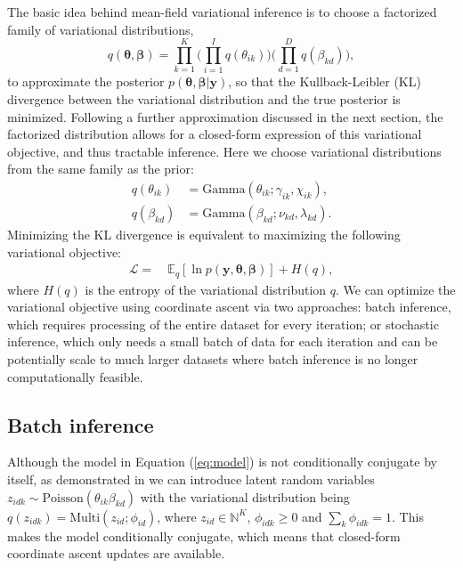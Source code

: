 The basic idea behind mean-field variational
inference is to choose a factorized family of variational distributions,
\begin{equation}
q(\boldsymbol{\theta}, \boldsymbol{\beta}) = \prod_{k=1}^K \Big(\prod_{i=1}^I q(\theta_{ik})\Big) \Big(\prod_{d=1}^D q(\beta_{kd})\Big),
\end{equation}
to approximate the posterior $p(\boldsymbol{\theta}, \boldsymbol{\beta} | \boldsymbol{y})$, so that the
Kullback-Leibler (KL) divergence between the variational distribution and
the true posterior is minimized. Following a further approximation discussed in the next section, the factorized distribution allows for a closed-form expression of this variational objective, and thus tractable inference. Here we choose variational distributions from the same family as the prior:
\begin{equation}
\begin{split}
q(\theta_{ik}) &= \text{Gamma}(\theta_{ik}; \gamma_{ik}, \chi_{ik}),\\
q(\beta_{kd}) &= \text{Gamma}(\beta_{kd}; \nu_{kd},  \lambda_{kd}).
\end{split}
\end{equation}
Minimizing the KL divergence is equivalent to maximizing the following variational objective:
\begin{align}\label{eq:vlb}
\mathcal{L} =~& \mathbb{E}_q[\ln p(\boldsymbol{y}, \boldsymbol{\theta}, \boldsymbol{\beta})] + H(q),
\end{align}
where $H(q)$ is the entropy of the variational distribution $q$.
We can optimize the variational objective using coordinate ascent via two approaches: batch inference, which requires processing of the entire dataset for every iteration; or stochastic inference, which only needs a small batch of data for each iteration and can be potentially scale to much larger datasets where batch inference is no longer computationally feasible.

\subsection{Batch inference} \label{sec:batch}
Although the model in Equation (\ref{eq:model}) is not conditionally conjugate by itself, as demonstrated in \cite{cemgil2009bayesian} we can introduce latent random variables $z_{idk} \sim \text{Poisson}( \theta_{ik} \beta_{kd})$
with the variational distribution being $q(z_{idk}) = \text{Multi}(z_{id}; \phi_{id})$, where $z_{id} \in \mathbb{N}^K$, $\phi_{idk} \geq 0$ and $\sum_k \phi_{idk} = 1$.
This makes the model conditionally conjugate, which means that closed-form coordinate ascent updates are available. 

